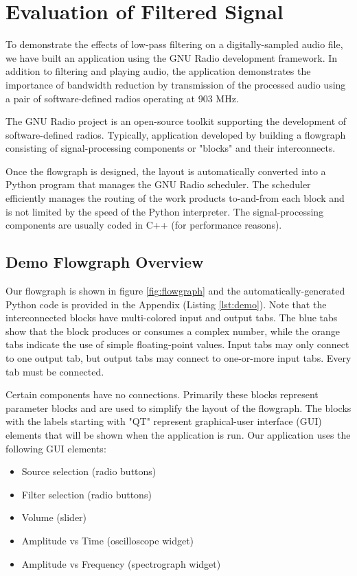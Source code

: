 \section{Evaluation of Filtered Signal}

To demonstrate the effects of low-pass filtering on a
digitally-sampled audio file, we have built an application using
the GNU Radio development framework. In addition to filtering and
playing audio, the application demonstrates the importance of
bandwidth reduction by transmission of the processed audio using
a pair of software-defined radios operating at 903 MHz.

The GNU Radio project \cite{GNU:radio} is an open-source toolkit
supporting the development of software-defined radios. Typically,
application developed by building a flowgraph consisting
of signal-processing components or "blocks" and their interconnects.  

Once the flowgraph is designed, the layout is automatically
converted into a Python program that manages the GNU Radio
scheduler. The scheduler efficiently manages the routing of the
work products to-and-from each block and is not limited by the
speed of the Python interpreter. The signal-processing components
are usually coded in C++ (for performance reasons).

\subsection{Demo Flowgraph Overview}
Our flowgraph is shown in figure \ref{fig:flowgraph} and the
automatically-generated Python code is provided in the Appendix
(Listing \ref{lst:demo}). Note that the interconnected blocks
have multi-colored input and output tabs. The blue tabs show that
the block produces or consumes a complex number, while the orange
tabs indicate the use of simple floating-point values. Input tabs
may only connect to one output tab, but output tabs may connect
to one-or-more input tabs. Every tab must be connected.  

Certain components have no connections.  Primarily these blocks
represent parameter blocks and are used to simplify the layout of
the flowgraph.  The blocks with the labels starting with "QT" 
represent graphical-user interface (GUI) elements that will be 
shown when the application is run.  Our application uses the 
following GUI elements:

\begin{itemize}
	\item Source selection (radio buttons)
	\item Filter selection (radio buttons)
	\item Volume (slider)
	\item Amplitude vs Time (oscilloscope widget)
	\item Amplitude vs Frequency (spectrograph widget)
\end{itemize}


